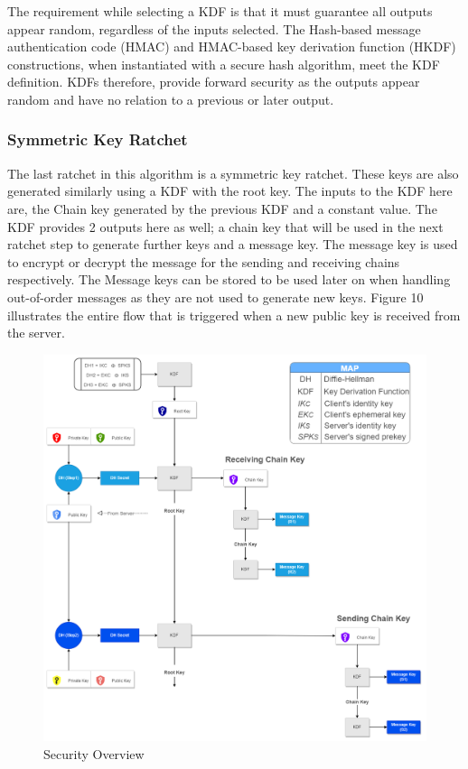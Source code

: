 The requirement while selecting a KDF is that it must guarantee all outputs appear random, regardless of the inputs selected. The Hash-based message authentication code (HMAC) and HMAC-based key derivation function (HKDF) constructions, when instantiated with a secure hash algorithm, meet the KDF definition. KDFs therefore, provide forward security as the outputs appear random and have no relation to a previous or later output.

\subsubsection{Symmetric Key Ratchet}
The last ratchet in this algorithm is a symmetric key ratchet. These keys are also generated similarly using a KDF with the root key. The inputs to the KDF here are, the Chain key generated by the previous KDF and a constant value. The KDF provides 2 outputs here as well; a chain key that will be used in the next ratchet step to generate further keys and a message key. The message key is used to encrypt or decrypt the message for the sending and receiving chains respectively. The Message keys can be stored to be used later on when handling out-of-order messages as they are not used to generate new keys. Figure 10 illustrates the entire flow that is triggered when a new public key is received from the server. 

\begin{figure}[ht!]
\centering
\includegraphics[width= 150mm]{./images/security_overview1-Overview.png}
\caption{Security Overview}
\end{figure}

